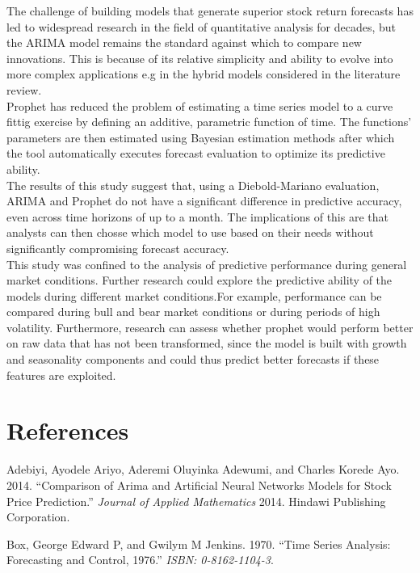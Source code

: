\documentclass[12pt,a4paper]{article}
\numberwithin{equation}{section}
\numberwithin{figure}{section}
\numberwithin{table}{section}
\begin{document}
The challenge of building models that generate superior stock return
forecasts has led to widespread research in the field of quantitative
analysis for decades, but the ARIMA model remains the standard against
which to compare new innovations. This is because of its relative
simplicity and ability to evolve into more complex applications e.g in
the hybrid models considered in the literature review.\\
Prophet has reduced the problem of estimating a time series model to a
curve fittig exercise by defining an additive, parametric function of
time. The functions' parameters are then estimated using Bayesian
estimation methods after which the tool automatically executes forecast
evaluation to optimize its predictive ability.\\
The results of this study suggest that, using a Diebold-Mariano
evaluation, ARIMA and Prophet do not have a significant difference in
predictive accuracy, even across time horizons of up to a month. The
implications of this are that analysts can then chosse which model to
use based on their needs without significantly compromising forecast
accuracy.\\
This study was confined to the analysis of predictive performance during
general market conditions. Further research could explore the predictive
ability of the models during different market conditions.For example,
performance can be compared during bull and bear market conditions or
during periods of high volatility. Furthermore, research can assess
whether prophet would perform better on raw data that has not been
transformed, since the model is built with growth and seasonality
components and could thus predict better forecasts if these features are
exploited.

\section*{References}\label{references}

\hypertarget{refs}{}
\hypertarget{ref-adebiyi2014comparison}{}
Adebiyi, Ayodele Ariyo, Aderemi Oluyinka Adewumi, and Charles Korede
Ayo. 2014. ``Comparison of Arima and Artificial Neural Networks Models
for Stock Price Prediction.'' \emph{Journal of Applied Mathematics}
2014. Hindawi Publishing Corporation.

\hypertarget{ref-box1970time}{}
Box, George Edward P, and Gwilym M Jenkins. 1970. ``Time Series
Analysis: Forecasting and Control, 1976.'' \emph{ISBN: 0-8162-1104-3}.
\end{document}
